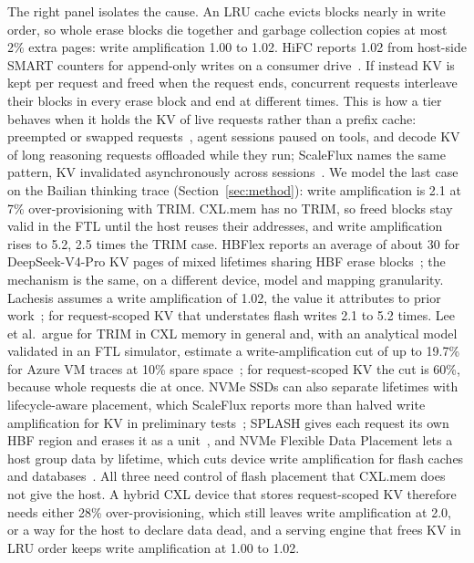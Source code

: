 \documentclass[acmsmall,screen,review]{acmart}
\begin{document}
The right panel isolates the cause. An LRU cache evicts blocks nearly in write order, so whole
erase blocks die together and garbage collection copies at most 2\% extra pages: write
amplification 1.00 to 1.02. HiFC reports 1.02 from host-side SMART counters for append-only writes on a consumer
drive~\cite{hifc}. If instead KV is kept per request and freed when the request ends, concurrent requests interleave
their blocks in every erase block and end at different times. This is how a tier behaves when it
holds the KV of live requests rather than a prefix cache: preempted or swapped requests~\cite{vllm},
agent sessions paused on tools, and decode KV of long reasoning requests offloaded while they run;
ScaleFlux names the same pattern, KV invalidated asynchronously across sessions~\cite{scaleflux}.
We model the last case on the Bailian thinking trace (Section~\ref{sec:method}): write amplification is 2.1 at 7\% over-provisioning
with TRIM. CXL.mem has no TRIM, so freed blocks stay valid in the FTL until the host reuses their
addresses, and write amplification rises to 5.2, 2.5 times the TRIM case. HBFlex reports an
average of about 30 for DeepSeek-V4-Pro KV pages of mixed lifetimes sharing HBF erase
blocks~\cite{hbflex}; the mechanism is the same, on a different device, model and mapping
granularity. Lachesis assumes a write amplification of 1.02, the value it attributes to prior
work~\cite{lachesis}; for request-scoped KV that understates flash writes 2.1 to 5.2 times. Lee et al.\ argue for TRIM in CXL memory in general and, with an analytical model
validated in an FTL simulator, estimate a write-amplification cut of up to 19.7\% for Azure VM
traces at 10\% spare space~\cite{trimcxl}; for request-scoped KV the cut is 60\%, because whole
requests die at once. NVMe SSDs can also separate lifetimes with lifecycle-aware placement, which
ScaleFlux reports more than halved write amplification for KV in preliminary
tests~\cite{scaleflux}; SPLASH gives each request its own HBF region and erases it as a
unit~\cite{splash}, and NVMe Flexible Data Placement lets a host group data by lifetime, which cuts
device write amplification for flash caches and databases~\cite{fdp_cachelib,fdp_promise}. All three need control of flash placement that CXL.mem does not give the host. A hybrid CXL
device that stores request-scoped KV therefore needs either 28\%
over-provisioning, which still leaves write amplification at 2.0, or a way for the host to declare data dead, and a serving engine that frees KV
in LRU order keeps write amplification at 1.00 to 1.02.
\end{document}
